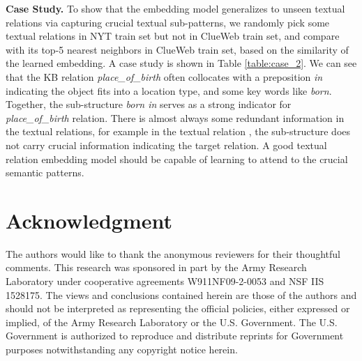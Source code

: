 \documentclass[11pt,a4paper]{article}
\begin{document}
\textbf{Case Study.} To show that the embedding model generalizes to unseen textual relations via capturing crucial textual sub-patterns, we randomly pick some textual relations in NYT train set but not in ClueWeb train set, and compare with its top-5 nearest neighbors in ClueWeb train set, based on the similarity of the learned embedding. A case study is shown in Table \ref{table:case_2}.
We can see that the KB relation \textit{place\_of\_birth} often collocates with a preposition \textit{in} indicating the object fits into a location type, and some key words like \textit{born}. Together, the sub-structure \textit{born in} serves as a strong indicator for \textit{place\_of\_birth} relation.
There is almost always some redundant information in the textual relations, for example in the textual relation , the sub-structure  does not carry crucial information indicating the target relation. A good textual relation embedding model should be capable of learning to attend to the crucial semantic patterns.  

\section*{Acknowledgment}
The authors would like to thank the anonymous reviewers for their thoughtful comments. This research was sponsored in part by the Army Research Laboratory under cooperative agreements W911NF09-2-0053 and NSF IIS 1528175. The views and conclusions contained herein are those of the authors and should not be interpreted as representing the official policies, either expressed or implied, of the Army Research Laboratory or the U.S. Government. The U.S. Government is authorized to reproduce and distribute reprints for Government purposes notwithstanding any copyright notice herein.



\end{document}
